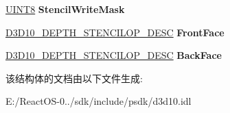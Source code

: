 \begin{DoxyCompactItemize}
\hyperlink{_processor_bind_8h_ab27e9918b538ce9d8ca692479b375b6a}{U\+I\+N\+T8} {\bfseries Stencil\+Write\+Mask}
\item 
\mbox{\label{struct_d3_d10___d_e_p_t_h___s_t_e_n_c_i_l___d_e_s_c_afc51e38d1c5bc26ce03e301836b65345}} 
\hyperlink{struct_d3_d10___d_e_p_t_h___s_t_e_n_c_i_l_o_p___d_e_s_c}{D3\+D10\+\_\+\+D\+E\+P\+T\+H\+\_\+\+S\+T\+E\+N\+C\+I\+L\+O\+P\+\_\+\+D\+E\+SC} {\bfseries Front\+Face}
\item 
\mbox{\label{struct_d3_d10___d_e_p_t_h___s_t_e_n_c_i_l___d_e_s_c_a6ea38b19b97b5e4efebbded7cfac012d}} 
\hyperlink{struct_d3_d10___d_e_p_t_h___s_t_e_n_c_i_l_o_p___d_e_s_c}{D3\+D10\+\_\+\+D\+E\+P\+T\+H\+\_\+\+S\+T\+E\+N\+C\+I\+L\+O\+P\+\_\+\+D\+E\+SC} {\bfseries Back\+Face}
\end{DoxyCompactItemize}


该结构体的文档由以下文件生成\+:\begin{DoxyCompactItemize}
\item 
E\+:/\+React\+O\+S-\/0../sdk/include/psdk/d3d10.\+idl\end{DoxyCompactItemize}
